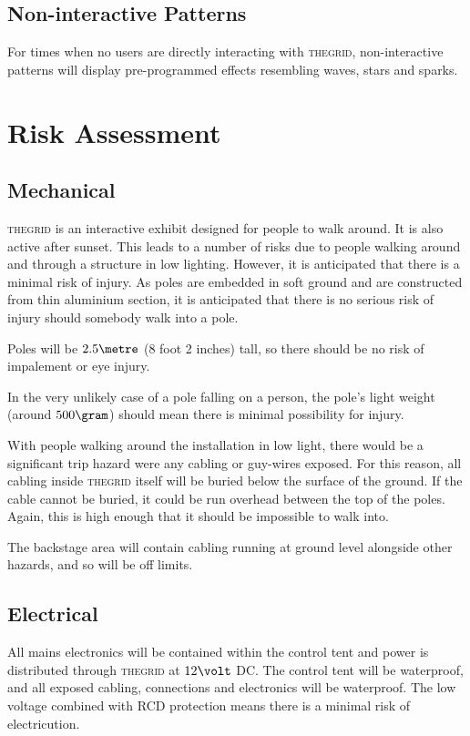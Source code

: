 \documentclass[12pt]{article} %
\newcommand{\thegrid}{\textsc{the\textperiodcentered grid}\xspace}
\begin{document}
\subsection{Non-interactive Patterns}
For times when no users are directly interacting with \thegrid, non-interactive patterns will display pre-programmed effects resembling waves, stars and sparks.

\section{Risk Assessment}
\subsection{Mechanical}
\thegrid is an interactive exhibit designed for people to walk around.  It is also active after sunset.  This leads to a number of risks due to people walking around and through a structure in low lighting.  However, it is anticipated that there is a minimal risk of injury.  As poles are embedded in soft ground and are constructed from thin aluminium section, it is anticipated that there is no serious risk of injury should somebody walk into a pole.

Poles will be $2.5\metre$ (8 foot 2 inches) tall, so there should be no risk of impalement or eye injury.

In the very unlikely case of a pole falling on a person, the pole's light weight (around $500\gram$) should mean there is minimal possibility for injury.

With people walking around the installation in low light, there would be a significant trip hazard were any cabling or guy-wires exposed.  For this reason, all cabling inside \thegrid itself will be buried below the surface of the ground.  If the cable cannot be buried, it could be run overhead between the top of the poles.  Again, this is high enough that it should be impossible to walk into.

The backstage area will contain cabling running at ground level alongside other hazards, and so will be off limits.

\subsection{Electrical}
All mains electronics will be contained within the control tent and power is distributed through \thegrid at $12\volt$ DC.  The control tent will be waterproof, and all exposed cabling, connections and electronics will be waterproof.  The low voltage combined with RCD protection means there is a minimal risk of electricution.
\end{document}

